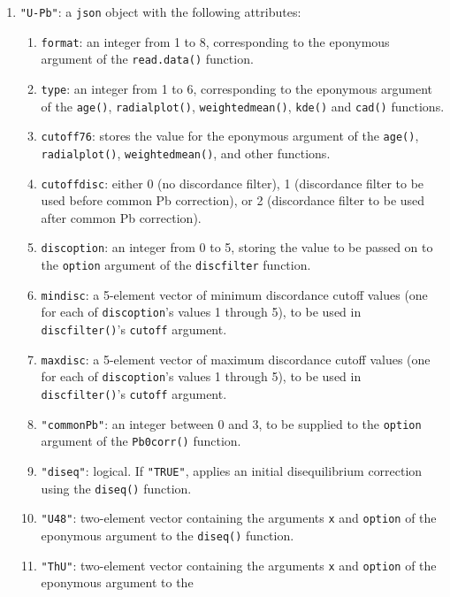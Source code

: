 \begin{refsection}
\begin{enumerate}[leftmargin=\parindent,align=left,
      labelwidth=\parindent,label*=2.\arabic*.]
\begin{enumerate}[leftmargin=\parindent,align=left,labelwidth=\parindent,label*=\arabic*.]
    samples to be omitted from the plots.
  \end{enumerate}
\item{\tt "U-Pb"}: a \texttt{json} object with the following
  attributes:
  \begin{enumerate}[leftmargin=\parindent,align=left,labelwidth=\parindent,label*=\arabic*.]
  \item{\tt format}: an integer from 1 to 8, corresponding to the
    eponymous argument of the \texttt{read.data()} function.
  \item{\tt type}: an integer from 1 to 6, corresponding to the
    eponymous argument of the \texttt{age()}, \texttt{radialplot()},
    \texttt{weightedmean()}, \texttt{kde()} and \texttt{cad()}
    functions.
  \item{\tt cutoff76}: stores the value for the eponymous argument of
    the \texttt{age()}, \texttt{radialplot()},
    \texttt{weightedmean()}, and other functions.
  \item{\tt cutoffdisc}: either 0 (no discordance filter), 1
    (discordance filter to be used before common Pb correction), or 2
    (discordance filter to be used after common Pb correction).
  \item{\tt discoption}: an integer from 0 to 5, storing the value to be
    passed on to the \texttt{option} argument of the
    \texttt{discfilter} function.
  \item{\tt mindisc}: a 5-element vector of minimum discordance cutoff
    values (one for each of \texttt{discoption}'s values 1 through 5),
    to be used in \texttt{discfilter()}'s \texttt{cutoff} argument.
  \item{\tt maxdisc}: a 5-element vector of maximum discordance cutoff
    values (one for each of \texttt{discoption}'s values 1 through 5),
    to be used in \texttt{discfilter()}'s \texttt{cutoff} argument.
  \item{\tt "commonPb"}: an integer between 0 and 3, to be supplied to
    the \texttt{option} argument of the \texttt{Pb0corr()} function.
  \item{\tt "diseq"}: logical. If \texttt{"TRUE"}, applies an initial
    disequilibrium correction using the \texttt{diseq()} function.
  \item{\tt "U48"}: two-element vector containing the arguments
    \texttt{x} and \texttt{option} of the eponymous argument to the
    \texttt{diseq()} function.
  \item{\tt "ThU"}: two-element vector containing the arguments
    \texttt{x} and \texttt{option} of the eponymous argument to the

\end{enumerate}
\end{enumerate}
\end{refsection}
